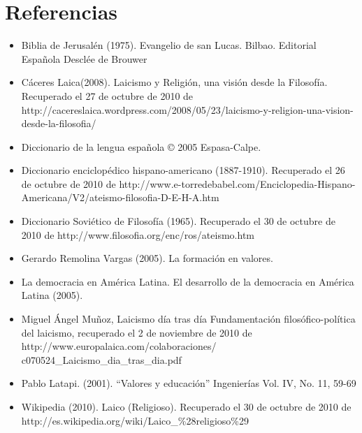 \documentclass[12pt]{book} %
\begin{document}
\section{Referencias}
\begin{itemize}
\item Biblia de Jerusalén (1975). Evangelio de san Lucas. Bilbao. Editorial Española Desclée de Brouwer
\item Cáceres Laica(2008). Laicismo y Religión, una visión desde la Filosofía. Recuperado el 27 de octubre de 2010 de http://cacereslaica.wordpress.com/2008/05/23/laicismo-y-religion-una-vision-desde-la-filosofia/
\item Diccionario de la lengua española © 2005 Espasa-Calpe.
\item Diccionario enciclopédico hispano-americano (1887-1910). Recuperado el 26 de octubre de 2010 de http://www.e-torredebabel.com/Enciclopedia-Hispano-Americana/V2/ateismo-filosofia-D-E-H-A.htm
\item Diccionario Soviético de Filosofía (1965). Recuperado el 30 de octubre de 2010 de http://www.filosofia.org/enc/ros/ateismo.htm
\item Gerardo Remolina Vargas (2005). La formación en valores.
\item La democracia en América Latina. El desarrollo de la democracia en América Latina (2005).
\item Miguel Ángel Muñoz, Laicismo día tras día Fundamentación filosófico-política del laicismo, recuperado el 2 de noviembre de 2010 de\\http://www.europalaica.com/colaboraciones/\\c070524\_Laicismo\_dia\_tras\_dia.pdf
\item Pablo Latapi. (2001). “Valores y educación” Ingenierías Vol. IV, No. 11, 59-69
\item Wikipedia (2010). Laico (Religioso). Recuperado el 30 de octubre de 2010 de http://es.wikipedia.org/wiki/Laico\_\%28religioso\%29
\end{itemize}
\end{document}
